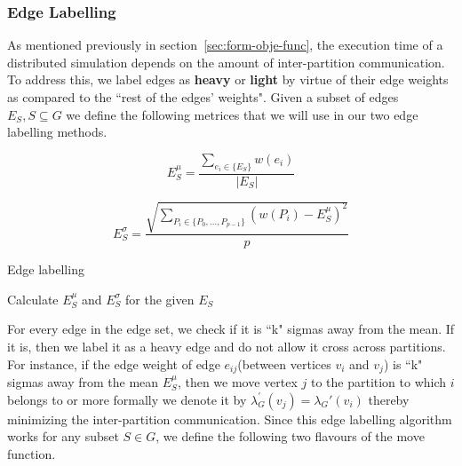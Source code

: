 \subsubsection{Edge Labelling}
\label{sec:opti-glob-edge}
As mentioned previously in section~\ref{sec:form-obje-func}, the execution time of a distributed simulation depends on the amount of inter-partition communication. To address this, we label edges as \textbf{heavy} or \textbf{light} by virtue of their edge weights as compared to the ``rest of the edges' weights". Given a subset of edges $E_S, S \subseteq G$ we define the following metrices that we will use in our two edge labelling methods.

\begin{equation}
\label{eq:comm1-mean}
E_S^\mu = \frac{\sum\limits_{e_i \in \{E_S\}} w(e_i)}{|E_S|}
\end{equation}

\begin{equation}
\label{eq:comm1}
E_S^\sigma = \frac{\sqrt{\sum\limits_{P_i \in \{P_0,\dots,P_{p-1}\}} (w(P_i) - E_S^\mu)^2}}{p}
\end{equation}

\begin{algorithm}[ht!]
    \caption{Edge labelling}
    \label{algo:ga}
    Calculate $E_S^\mu$ and $E_S^\sigma$ for the given $E_S$\\
\end{algorithm}

For every edge in the edge set, we check if it is ``k" sigmas away from the mean. If it is, then we label it as a heavy edge and do not allow it cross across partitions. For instance, if the edge weight of edge $e_{ij}$(between vertices $v_i$ and $v_j$) is ``k" sigmas away from the mean $E_S^\mu$, then we move vertex $j$ to the partition to which $i$ belongs to or more formally we denote it by $\lambda_G^{'}(v_j) = \lambda_G{'}(v_i)$ thereby minimizing the inter-partition communication. Since this edge labelling algorithm works for any subset $S \in G$, we define the following two flavours of the move function.

